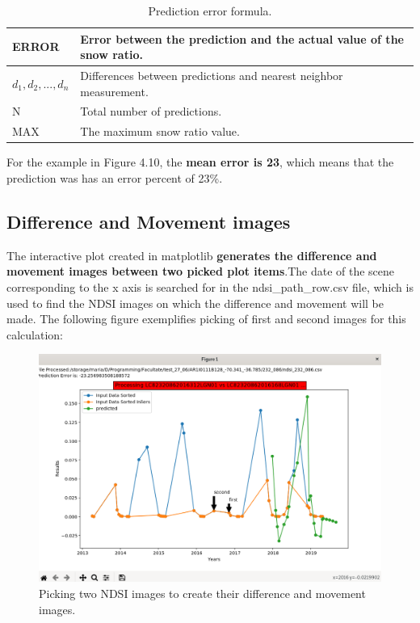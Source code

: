 \documentclass[12pt, a4paper]{report}
\begin{document}
	\begin{table} [H]
		\center
		\begin{tabular} {|  l | L{10cm} |}
			\hline
			ERROR & Error between the prediction and the actual value of the snow ratio. \\ [0.2ex]
			\hline
			$d_{1}, d_{2}, ..., d_{n}$ & Differences between predictions and nearest neighbor measurement.\\ [0.2ex]
			\hline
			N & Total number of predictions. \\ [0.2ex]
			\hline
			MAX & The maximum snow ratio value. \\ [0.2ex]
			\hline
		\end{tabular}
		\caption{Prediction error formula.}
		\label{table:ndsi_table}
	\end{table}
	
	For the example in Figure 4.10, the \textbf{mean error is 23}, which means that the prediction was has an error percent of 23\%.
	
	\subsection{Difference and Movement images}
	The interactive plot created in matplotlib \textbf{generates the difference and movement images between two picked plot items}.The date of the scene corresponding to the x axis is searched for in the ndsi\_path\_row.csv file, which is used to find the NDSI images on which the difference and movement will be made. The following figure exemplifies picking of first and second images for this calculation:
	
	\begin{figure}[H]
		\centering
		\includegraphics[scale=1.7]{plot_first_second.png}
		\caption{Picking two NDSI images to create their difference and movement images.}
		\label{fig:first_second_1}
	\end{figure}
	
\end{document}
